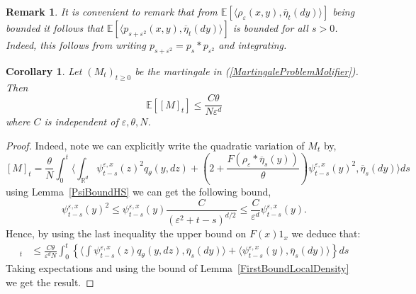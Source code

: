 \documentclass[a4paper,12pt]{article}
\newtheorem{corollary}[theorem]{Corollary}
\newtheorem{remark}[theorem]{Remark}
\newcommand{\EE}{\mathbb{E}}
\newcommand{\1}{{\bf {1}}}
\def\epsilon{\varepsilon}
\begin{document}
\begin{remark} \label{Remark:BoundLocalDensity}
It is convenient to remark that from $\EE\left[ \langle \rho_\epsilon(x,y), \overline{\eta}_t(dy) \rangle \right]$ being bounded it follows that $\EE[ \langle p_{s+\epsilon^2}(x,y), \overline{\eta}_t(dy) \rangle ]$ is bounded for all $s>0$. Indeed, this follows from writing $p_{s+\epsilon^2} = p_s * p_{\epsilon^2}$ and integrating.
\end{remark}

\begin{corollary}
Let $(M_t)_{t \geq 0}$ be the martingale in (\ref{MartingaleProblemMolifier}). Then
\[ \EE\left[ [M]_t \right] \leq \frac{C \theta}{ N \epsilon^{d}} \]
where $C$ is independent of $\epsilon,\theta,N$. \label{Cor:ControlQVMQ}
\end{corollary}
\begin{proof}
Indeed, note we can explicitly write the quadratic variation of $M_t$ by,
\[ [M]_t = \frac{\theta}{N} \int_0^t \langle \int_{\mathbb{R}^d} \psi_{t-s}^{\epsilon,x}(z)^2 q_\theta(y,dz) + \left(2+\frac{F(\rho_\epsilon * \overline{\eta}_s(y))}{\theta}\right)\psi_{t-s}^{\epsilon,x}(y)^2, \overline{\eta}_s(dy) \rangle  ds\]
using Lemma~\ref{PsiBoundHS} we can get the following bound,
\[ \psi_{t-s}^{\epsilon,x}(y)^2 \leq \psi_{t-s}^{\epsilon,x}(y) \frac{C}{(\epsilon^2+t-s)^{d/2}} \leq \frac{C}{\epsilon^d} \psi_{t-s}^{\epsilon,x}(y). \]
Hence, by using the last inequality the upper bound on $F(x)1_{x}$ we deduce that:
\begin{align*}
[M]_t &\leq \frac{C \theta}{\epsilon^d N} \int_0^t \left\{  \langle \int \psi_{t-s}^{\epsilon,x}(z) q_\theta(y,dz), \overline{\eta}_s(dy) \rangle + \langle \psi_{t-s}^{\epsilon,x}(y), \overline{\eta}_s(dy)\rangle \right\} ds 
\end{align*}
Taking expectations and using the bound of Lemma~\ref{FirstBoundLocalDensity} we get the result.
\end{proof}

\end{document}
